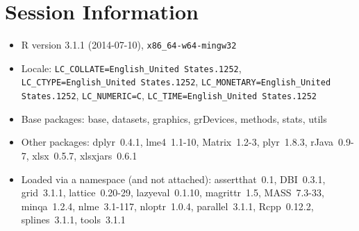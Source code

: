 \documentclass{article}
\begin{document}
\section*{Session Information}
\begin{itemize}\raggedright
  \item R version 3.1.1 (2014-07-10), \verb|x86_64-w64-mingw32|
  \item Locale: \verb|LC_COLLATE=English_United States.1252|, \verb|LC_CTYPE=English_United States.1252|, \verb|LC_MONETARY=English_United States.1252|, \verb|LC_NUMERIC=C|, \verb|LC_TIME=English_United States.1252|
  \item Base packages: base, datasets, graphics, grDevices, methods,
    stats, utils
  \item Other packages: dplyr~0.4.1, lme4~1.1-10, Matrix~1.2-3,
    plyr~1.8.3, rJava~0.9-7, xlsx~0.5.7, xlsxjars~0.6.1
  \item Loaded via a namespace (and not attached): assertthat~0.1,
    DBI~0.3.1, grid~3.1.1, lattice~0.20-29, lazyeval~0.1.10,
    magrittr~1.5, MASS~7.3-33, minqa~1.2.4, nlme~3.1-117, nloptr~1.0.4,
    parallel~3.1.1, Rcpp~0.12.2, splines~3.1.1, tools~3.1.1
\end{itemize}
\end{document}
